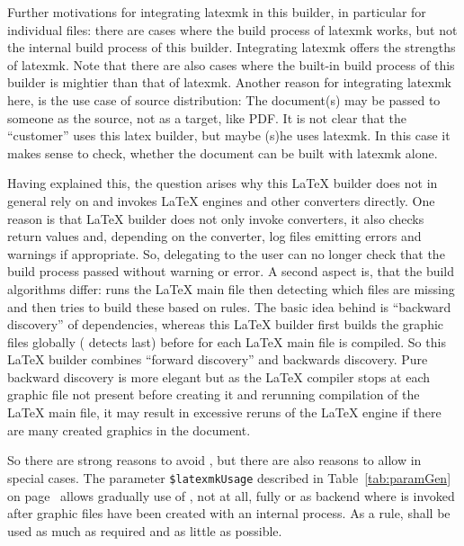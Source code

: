 Further motivations for integrating latexmk in this builder, 
in particular for individual files: 
there are cases where the build process of latexmk works, 
but not the internal build process of this builder. 
Integrating latexmk offers the strengths of latexmk. 
Note that there are also cases 
where the built-in build process of this builder 
is mightier than that of latexmk. 
Another reason for integrating latexmk here, 
is the use case of source distribution: 
The document(s) may be passed to someone as the source, %
not as a target, like PDF\@. 
It is not clear that the ``customer'' uses this latex builder, 
but maybe (s)he uses latexmk. %
In this case it makes sense to check, 
whether the document can be built with latexmk alone. 

Having explained this, the question arises 
why this \LaTeX{} builder does not in general rely on  
and invokes \LaTeX{} engines and other converters directly. 
One reason is that \LaTeX{} builder does not only invoke converters, 
it also checks return values and, depending on the converter, 
log files emitting errors and warnings if appropriate. 
So, delegating to  
the user can no longer check that the build process passed without warning or error. 
A second aspect is, that the build algorithms differ: 
 runs the \LaTeX{} main file then detecting which files are missing 
and then tries to build these based on rules. 
The basic idea behind is ``backward discovery'' of dependencies, 
whereas this \LaTeX{} builder first builds the graphic files globally 
( detects last) 
before for each \LaTeX{} main file is compiled. 
So this \LaTeX{} builder combines ``forward discovery'' and backwards discovery. 
Pure backward discovery is more elegant 
but as the \LaTeX{} compiler stops at each graphic file not present 
before creating it and rerunning compilation of the \LaTeX{} main file, 
it may result in excessive reruns of the \LaTeX{} engine 
if there are many created graphics in the document. 

So there are strong reasons to avoid , 
but there are also reasons to allow in special cases. 
The parameter \texttt{\$latexmkUsage} described in Table~\ref{tab:paramGen} 
on page~\pageref{tab:paramGen} allows gradually use of , 
not at all, fully or as backend where  is invoked 
after graphic files have been created with an internal process. 
As a rule,  shall be used as much as required and as little as possible. 

